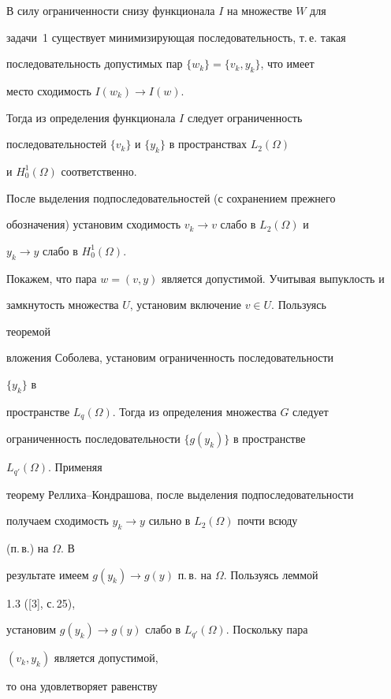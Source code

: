 \begin{pf} 


В силу ограниченности снизу функционала $I$ на множестве $W$ для


задачи~1 существует минимизирующая последовательность, т.\,е. такая 


последовательность допустимых пар $\{w_k\}=\{v_k,y_k\}$, что имеет 


место сходимость $I(w_k)\to I(w)$. 


Тогда из определения функционала $I$ следует ограниченность 


последовательностей $\{v_k\}$ и $\{y_k\}$ в пространствах $L_2(\Omega)$ 


и $H^1_0(\Omega)$ соответственно. 


После выделения подпоследовательностей (с сохранением прежнего 


обозначения) установим сходимость $v_k\to v$ слабо в $L_2(\Omega)$ и 


$y_k\to y$ слабо в $H^1_0(\Omega)$. 


 


Покажем, что пара $w=(v,y)$ является допустимой. Учитывая выпуклость и 


замкнутость множества $U$, установим включение $v\in U$. Пользуясь 


теоремой 


вложения Соболева, установим ограниченность последовательности 


$\{y_k\}$ в 


пространстве $L_q(\Omega)$. Тогда из определения множества $G$ следует 


ограниченность последовательности $\{g(y_k)\}$ в пространстве 


$L_{q'}(\Omega)$. Применяя 


теорему Реллиха--Кондрашова, после выделения подпоследовательности 


получаем сходимость $y_k\to y$ сильно в $L_2(\Omega)$ почти всюду 


(п.\,в.) на $\Omega$. В 


результате имеем $g(y_k)\to g(y)$ п.\,в. на $\Omega$. Пользуясь леммой 


1.3 ([3], с.\,25), 


установим $g(y_k)\to g(y)$ слабо в $L_{q'}(\Omega)$. Поскольку пара 


$(v_k,y_k)$ является допустимой, 


то она удовлетворяет равенству 



\end{pf}
